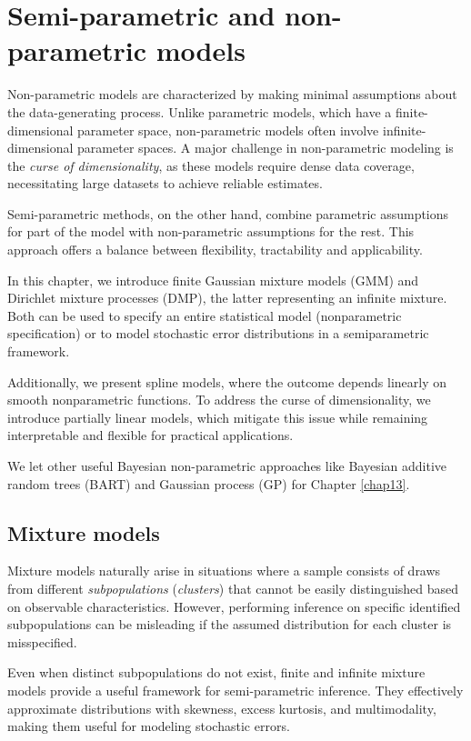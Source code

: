 \chapter{Semi-parametric and non-parametric models}\label{chap11}

Non-parametric models are characterized by making minimal assumptions about the data-generating process. Unlike parametric models, which have a finite-dimensional parameter space, non-parametric models often involve infinite-dimensional parameter spaces. A major challenge in non-parametric modeling is the \textit{curse of dimensionality}, as these models require dense data coverage, necessitating large datasets to achieve reliable estimates.

Semi-parametric methods, on the other hand, combine parametric assumptions for part of the model with non-parametric assumptions for the rest. This approach offers a balance between flexibility, tractability and applicability.

In this chapter, we introduce finite Gaussian mixture models (GMM) and Dirichlet mixture processes (DMP), the latter representing an infinite mixture. Both can be used to specify an entire statistical model (nonparametric specification) or to model stochastic error distributions in a semiparametric framework.

Additionally, we present spline models, where the outcome depends linearly on smooth nonparametric functions. To address the curse of dimensionality, we introduce partially linear models, which mitigate this issue while remaining interpretable and flexible for practical applications.

We let other useful Bayesian non-parametric approaches like Bayesian additive random trees (BART) and Gaussian process (GP) for Chapter \ref{chap13}. 

\section{Mixture models}\label{sec11_1}
Mixture models naturally arise in situations where a sample consists of draws from different \textit{subpopulations} (\textit{clusters}) that cannot be easily distinguished based on observable characteristics. However, performing inference on specific identified subpopulations can be misleading if the assumed distribution for each cluster is misspecified.  

Even when distinct subpopulations do not exist, finite and infinite mixture models provide a useful framework for semi-parametric inference. They effectively approximate distributions with skewness, excess kurtosis, and multimodality, making them useful for modeling stochastic errors.

